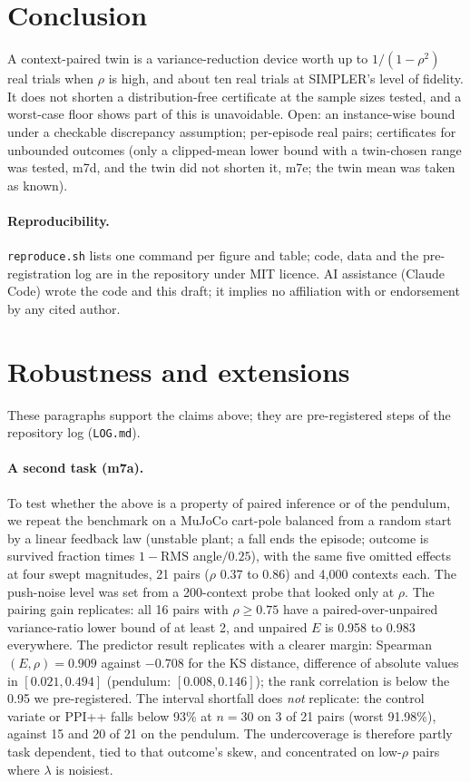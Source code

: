 \documentclass[11pt]{article}
\begin{document}
\section{Conclusion}
A context-paired twin is a variance-reduction device worth up to $1/(1-\rho^2)$ real trials when $\rho$ is high, and about ten real trials at SIMPLER's level of fidelity. It does not shorten a distribution-free certificate at the sample sizes tested, and a worst-case floor shows part of this is unavoidable. Open: an instance-wise bound under a checkable discrepancy assumption; per-episode real pairs; certificates for unbounded outcomes (only a clipped-mean lower bound with a twin-chosen range was tested, m7d, and the twin did not shorten it, m7e; the twin mean was taken as known).

\paragraph{Reproducibility.} \texttt{reproduce.sh} lists one command per figure and table; code, data and the pre-registration log are in the repository under MIT licence. AI assistance (Claude Code) wrote the code and this draft; it implies no affiliation with or endorsement by any cited author.

\appendix
\section{Robustness and extensions}
These paragraphs support the claims above; they are pre-registered steps of the repository log (\texttt{LOG.md}).
\paragraph{A second task (m7a).} To test whether the above is a property of paired inference or of the pendulum, we repeat the benchmark on a MuJoCo cart-pole balanced from a random start by a linear feedback law (unstable plant; a fall ends the episode; outcome is survived fraction times $1-\mathrm{RMS}$ angle$/0.25$), with the same five omitted effects at four swept magnitudes, 21 pairs ($\rho$ 0.37 to 0.86) and 4{,}000 contexts each. The push-noise level was set from a 200-context probe that looked only at $\rho$. The pairing gain replicates: all 16 pairs with $\rho\ge0.75$ have a paired-over-unpaired variance-ratio lower bound of at least 2, and unpaired $E$ is 0.958 to 0.983 everywhere. The predictor result replicates with a clearer margin: Spearman$(E,\rho)=0.909$ against $-0.708$ for the KS distance, difference of absolute values in $[0.021,0.494]$ (pendulum: $[0.008,0.146]$); the rank correlation is below the 0.95 we pre-registered. The interval shortfall does \emph{not} replicate: the control variate or PPI++ falls below 93\% at $n=30$ on 3 of 21 pairs (worst 91.98\%), against 15 and 20 of 21 on the pendulum. The undercoverage is therefore partly task dependent, tied to that outcome's skew, and concentrated on low-$\rho$ pairs where $\lambda$ is noisiest.
\end{document}
